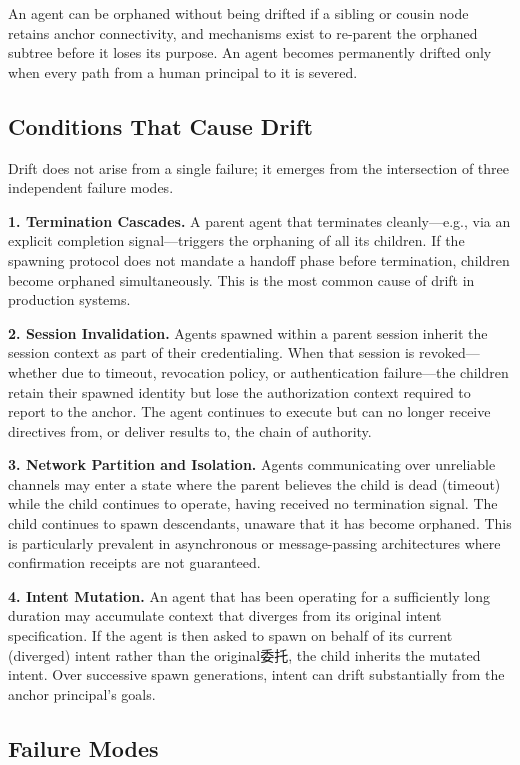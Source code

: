 An agent can be orphaned without being drifted if a sibling or cousin node retains anchor connectivity, and mechanisms exist to re-parent the orphaned subtree before it loses its purpose. An agent becomes permanently drifted only when every path from a human principal to it is severed.

\subsection{Conditions That Cause Drift}

Drift does not arise from a single failure; it emerges from the intersection of three independent failure modes.

\textbf{1. Termination Cascades.} A parent agent that terminates cleanly—e.g., via an explicit completion signal—triggers the orphaning of all its children. If the spawning protocol does not mandate a handoff phase before termination, children become orphaned simultaneously. This is the most common cause of drift in production systems.

\textbf{2. Session Invalidation.} Agents spawned within a parent session inherit the session context as part of their credentialing. When that session is revoked—whether due to timeout, revocation policy, or authentication failure—the children retain their spawned identity but lose the authorization context required to report to the anchor. The agent continues to execute but can no longer receive directives from, or deliver results to, the chain of authority.

\textbf{3. Network Partition and Isolation.} Agents communicating over unreliable channels may enter a state where the parent believes the child is dead (timeout) while the child continues to operate, having received no termination signal. The child continues to spawn descendants, unaware that it has become orphaned. This is particularly prevalent in asynchronous or message-passing architectures where confirmation receipts are not guaranteed.

\textbf{4. Intent Mutation.} An agent that has been operating for a sufficiently long duration may accumulate context that diverges from its original intent specification. If the agent is then asked to spawn on behalf of its current (diverged) intent rather than the original委托, the child inherits the mutated intent. Over successive spawn generations, intent can drift substantially from the anchor principal's goals.

\subsection{Failure Modes}

